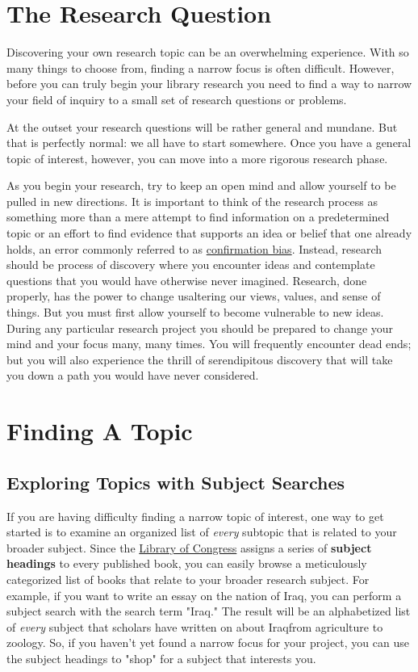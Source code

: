 \section{The Research Question}

Discovering your own research topic can be an overwhelming experience. With so
many things to choose from, finding a narrow focus is often difficult. However,
before you can truly begin your library research you need to find a way to
narrow your field of inquiry to a small set of research questions or problems.

At the outset your research questions will be rather general and mundane. But
that is perfectly normal: we all have to start somewhere. Once you have a
general topic of interest, however, you can move into a more rigorous research
phase.

As you begin your research, try to keep an open mind and allow yourself to be
pulled in new directions. It is important to think of the research process as
something more than a mere attempt to find information on a predetermined topic
or an effort to find evidence that supports an idea or belief that one already
holds, an error commonly referred to as \href{https://en.wikipedia.org/wiki/Confirmation_bias}{confirmation
bias}. Instead, research should be process of discovery where you encounter ideas and
contemplate questions that you would have otherwise never imagined. Research, done properly, has the power to change us\textemdash altering our views, values, and sense of things. But you must first allow yourself to become vulnerable to new ideas. During any particular research project you should be prepared to change your mind and your focus many, many times. You will frequently encounter dead ends; but you will also
experience the thrill of serendipitous discovery that will take you down a path
you would have never considered.

\section{Finding A Topic} \subsection{Exploring Topics with Subject Searches} If
you are having difficulty finding a narrow topic of interest, one way to get
started is to examine an organized list of \emph{every} subtopic that is
related to your broader subject. Since the
\href{http://catalog.loc.gov}{Library of Congress} assigns a series of
\textbf{subject headings} to every published book, you can easily browse a
meticulously categorized list of books that relate to your broader research
subject. For example, if you want to write an essay on the nation of Iraq, you
can perform a subject search with the search term "Iraq." The result will be an
alphabetized list of \emph{every} subject that scholars have written on about
Iraq\textemdash from agriculture to zoology. So, if you haven't yet found a
narrow focus for your project, you can use the subject headings to "shop" for a
subject that interests you.   \newpage

